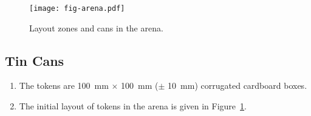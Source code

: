 \begin{figure}
  \texttt{[image: fig-arena.pdf]}
  \caption{Layout zones and cans in the arena.}
  \label{fig:arena}
\end{figure}

\subsection{Tin Cans}
\label{spec:cans}

\begin{enumerate}
  \item The tokens are \SI{100}{mm} $\times$ \SI{100}{mm} ($\pm$ \SI{10}{mm})
        corrugated cardboard boxes.
  \item The initial layout of tokens in the arena is given in
        Figure~\ref{fig:arena}.
\end{enumerate}


